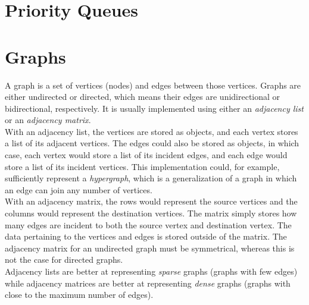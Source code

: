 \section{Priority Queues}

\section{Graphs}

A graph is a set of vertices (nodes) and edges between those vertices. Graphs are either undirected or directed, which means their edges are unidirectional or bidirectional, respectively. It is usually implemented using either an \textit{adjacency list} or an \textit{adjacency matrix}. \\

With an adjacency list, the vertices are stored as objects, and each vertex stores a list of its adjacent vertices. The edges could also be stored as objects, in which case, each vertex would store a list of its incident edges, and each edge would store a list of its incident vertices. This implementation could, for example, sufficiently represent a \textit{hypergraph}, which is a generalization of a graph in which an edge can join any number of vertices. \\

With an adjacency matrix, the rows would represent the source vertices and the columns would represent the destination vertices. The matrix simply stores how many edges are incident to both the source vertex and destination vertex. The data pertaining to the vertices and edges is stored outside of the matrix. The adjacency matrix for an undirected graph must be symmetrical, whereas this is not the case for directed graphs. \\

Adjacency lists are better at representing \textit{sparse} graphs (graphs with few edges) while adjacency matrices are better at representing \textit{dense} graphs (graphs with close to the maximum number of edges).

